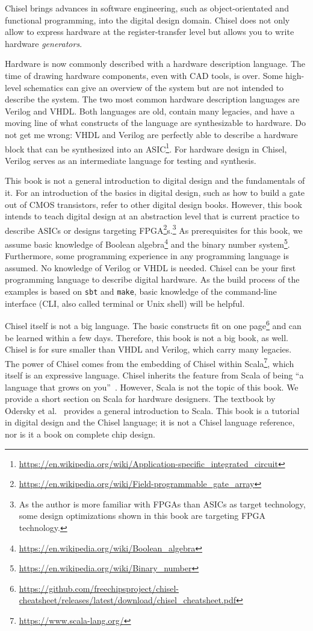 \documentclass[%
    10pt,
    headinclude, footexclude,
    openright, %
    notitlepage,
    cleardoubleempty,
    headsepline,
    pointlessnumbers,
    bibtotoc, idxtotoc,
    ]{scrbook}
\newcommand{\code}[1]{{\lstinline[basicstyle=\small\ttfamily]{#1}}}
\newcommand{\myref}[2]{\href{#1}{#2}}
\renewcommand{\myref}[2]{{#2}{\footnote{\url{#1}}}}
\begin{document}
Chisel brings advances in software engineering, such as object-orientated
and functional programming, into the digital design domain.
Chisel does not only allow to express hardware at the register-transfer level
but allows you to write hardware \emph{generators}.

Hardware is now commonly described with a hardware description language.
The time of drawing hardware components, even with CAD tools, is
over. Some high-level schematics can give an overview of the system but are
not intended to describe the system.
The two most common hardware description languages are Verilog and VHDL.
Both languages are old, contain many legacies, and have a moving line of what
constructs of the language are synthesizable to hardware.
Do not get me wrong: VHDL and Verilog are perfectly able to describe a hardware
block that can be synthesized into an
\myref{https://en.wikipedia.org/wiki/Application-specific_integrated_circuit}{ASIC}.
For hardware design in Chisel, Verilog serves as an intermediate language
for testing and synthesis.

This book is not a general introduction to digital design and the fundamentals of it.
For an introduction of the basics in digital design, such as how to build a gate out of
CMOS transistors, refer to other digital design books.
However, this book intends to teach digital design at an abstraction level that is
current practice to describe ASICs or designs targeting
\myref{https://en.wikipedia.org/wiki/Field-programmable_gate_array}{FPGA}s.\footnote{As the author is more familiar with FPGAs
than ASICs as target technology, some design optimizations shown in this book are
targeting FPGA technology.}
As prerequisites for this book, we assume basic knowledge of
\myref{https://en.wikipedia.org/wiki/Boolean_algebra}{Boolean algebra} and the
\myref{https://en.wikipedia.org/wiki/Binary_number}{binary number system}.
Furthermore, some programming experience in any programming language
is assumed. No knowledge of Verilog or VHDL is needed.
Chisel can be your first programming language to describe digital hardware.
As the build process of the examples is based on \code{sbt} and \code{make},
basic knowledge of the command-line interface (CLI, also called terminal or
Unix shell) will be helpful.

Chisel itself is not a big language. The basic constructs fit on
\myref{https://github.com/freechipsproject/chisel-cheatsheet/releases/latest/download/chisel_cheatsheet.pdf}{one page}
and can be learned within a few days.
Therefore, this book is not a big book, as well.
Chisel is for sure smaller than VHDL and Verilog, which carry many legacies.
The power of Chisel comes from the embedding of Chisel within
\myref{https://www.scala-lang.org/}{Scala}, which itself is an expressive language.
Chisel inherits the feature from Scala of being ``a language that grows on you''~\cite{Scala}.
However, Scala is not the topic of this book.
We provide a short section on Scala for hardware designers.
The textbook by Odersky et al.~\cite{Scala} provides a general introduction
to Scala.
This book is a tutorial in digital design and the Chisel language; it is not
a Chisel language reference, nor is it a book on complete chip design.
\end{document}
